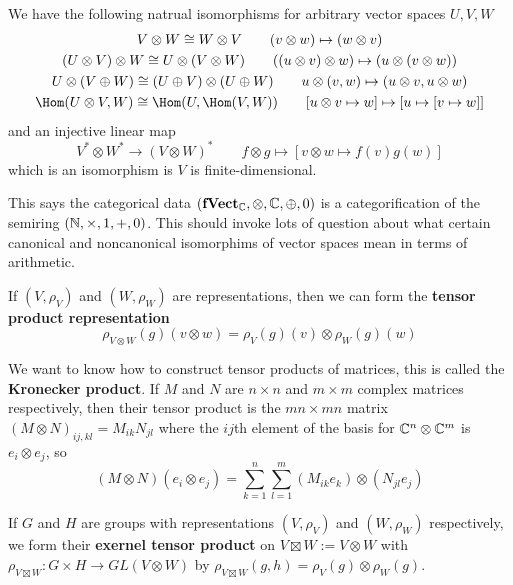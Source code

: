 \documentclass{article}
\begin{document}
\begin{corollary}
    We have the following natrual isomorphisms for arbitrary vector spaces $U,V,W$\begin{gather*}
        V\otimes W \cong W\otimes V \qquad (v\otimes w) \mapsto (w\otimes v) \\
        (U\otimes V) \otimes W \cong U \otimes (V\otimes W) \qquad ((u\otimes v) \otimes w) \mapsto (u\otimes (v\otimes w)) \\
        U \otimes (V\oplus W) \cong (U\oplus V) \otimes (U \oplus W) \qquad u\otimes (v,w) \mapsto (u\otimes v, u\otimes w)\\
        \Hom(U\otimes V, W) \cong \Hom(U, \Hom(V,W)) \qquad [u\otimes v \mapsto w] \mapsto [u\mapsto [v\mapsto w]]
    \end{gather*}
    and an injective linear map \[
    V^* \otimes W^* \rightarrow (V\otimes W)^* \qquad f\otimes g \mapsto [v\otimes w \mapsto f(v)g(w)]
    \] which is an isomorphism is $V$ is finite-dimensional.
\end{corollary}

This says the categorical data $(\textbf{fVect}_{\mathbb{C}},\otimes,\mathbb{C},\oplus,0)$ is a categorification of the semiring $(\mathbb{N},\times, 1,+,0)$. This should invoke lots of question about what certain canonical and noncanonical isomorphims of vector spaces mean in terms of arithmetic.

\begin{definition}
    If $(V,\rho_V)$ and $(W,\rho_W)$ are representations, then we can form the \textbf{tensor product representation} \[
    \rho_{V\otimes W}(g)(v\otimes w) = \rho_V(g)(v)\otimes \rho_W(g)(w)
    \]
\end{definition}

We want to know how to construct tensor products of matrices, this is called the \textbf{Kronecker product}. If $M$ and $N$ are $n\times n$ and $m\times m$ complex matrices respectively, then their tensor product is the $mn\times mn$ matrix $(M\otimes N)_{ij,kl} = M_{ik}N_{jl}$ where the $ij$th element of the basis for $\mathbb{C}^n\otimes \mathbb{C}^m$ is $e_i\otimes e_j$, so \[
 (M\otimes N)(e_i\otimes e_j) = \sum_{k=1}^n\sum_{l=1}^m (M_{ik} e_k)\otimes (N_{jl} e_j)
\]

\begin{definition}
    If $G$ and $H$ are groups with representations $(V,\rho_V)$ and $(W,\rho_W)$ respectively, we form their \textbf{exernel tensor product} on $V\boxtimes W:= V\otimes W$ with $\rho_{V\boxtimes W}:G\times H\rightarrow GL(V\otimes W)$ by $\rho_{V\boxtimes W}(g,h) = \rho_V(g)\otimes \rho_W(g)$.
\end{definition}
\end{document}
